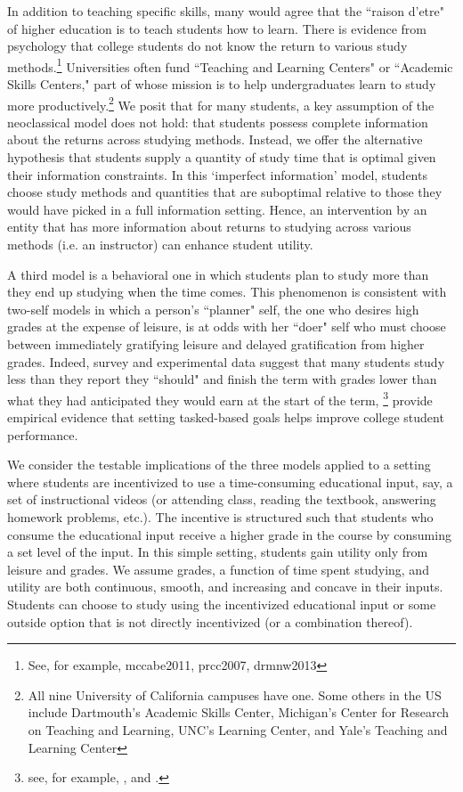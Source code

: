 \documentclass[12pt]{article}
\begin{document}
In addition to teaching specific skills, many would agree that the ``raison d'etre" of higher education is to teach students how to learn. There is evidence from psychology that college students do not know the return to various study methods.\footnote{See, for example, mccabe2011, prcc2007, drmnw2013} Universities often fund ``Teaching and Learning Centers" or ``Academic Skills Centers," part of whose mission is to help undergraduates learn to study more productively.\footnote{All nine University of California campuses have one. Some others in the US include Dartmouth's Academic Skills Center, Michigan's Center for Research on Teaching and Learning, UNC's Learning Center, and Yale's Teaching and Learning Center} We posit that for many students, a key assumption of the neoclassical model does not hold: that students possess complete information about the returns across studying methods. Instead, we offer the alternative hypothesis that students supply a quantity of study time that is optimal given their information constraints. In this `imperfect information' model, students choose study methods and quantities that are suboptimal relative to those they would have picked in a full information setting. Hence, an intervention by an entity that has more information about returns to studying across various methods (i.e. an instructor) can enhance student utility.

A third model is a behavioral one in which students plan to study more than they end up studying when the time comes. This phenomenon is consistent with two-self models in which a person's ``planner" self, the one who desires high grades at the expense of leisure, is at odds with her ``doer" self who must choose between immediately gratifying leisure and delayed gratification from higher grades.  Indeed, survey and experimental data suggest that many students study less than they report they ``should" and finish the term with grades lower than what they had anticipated they would earn at the start of the term, 
\footnote{see, for example, \textcite{ferrari1992},  \textcite{ccog2017} and \textcite{llo2016.}.}  \textcite{cgpr2020} provide empirical evidence that setting tasked-based goals helps improve college student performance.

We consider the testable implications of the three models applied to a setting where students are incentivized to use a time-consuming educational input, say, a set of instructional videos (or attending class, reading the textbook, answering homework problems, etc.). The incentive is structured such that students who consume the educational input receive a higher grade in the course by consuming a set level of the input. In this simple setting, students gain utility only from leisure and grades. We assume grades, a function of time spent studying, and utility are both continuous, smooth, and increasing and concave in their inputs. Students can choose to study using the incentivized educational input or some outside option that is not directly incentivized (or a combination thereof).
\end{document}
